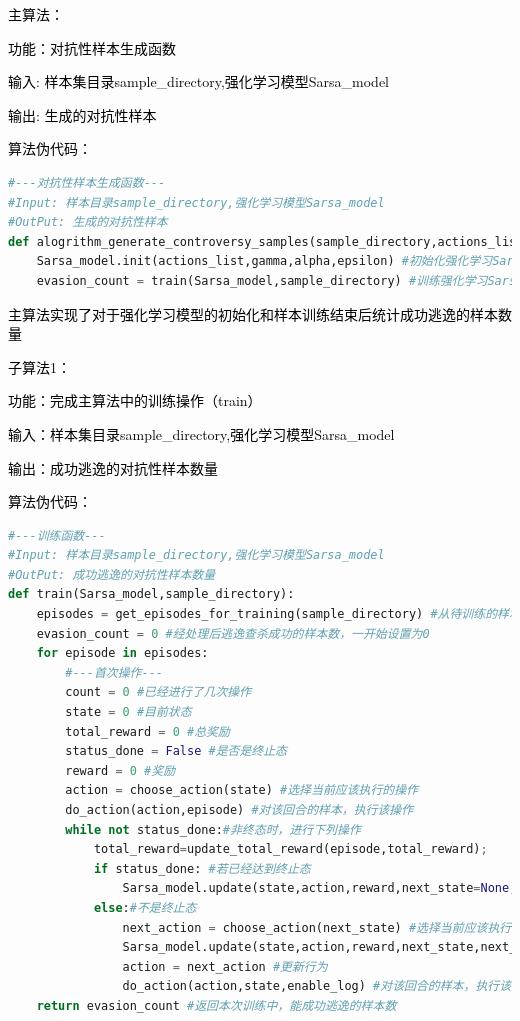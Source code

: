 \textcolor{black}{主算法：}

\textcolor{black}{功能：对抗性样本生成函数}

\textcolor{black}{输入: 样本集目录sample\_directory,强化学习模型Sarsa\_model }

\textcolor{black}{输出: 生成的对抗性样本}

\textcolor{black}{算法伪代码：}

\begin{lstlisting}[language=Python, caption={}, label={lst:pythonfile1}]
#---对抗性样本生成函数---
#Input: 样本目录sample_directory,强化学习模型Sarsa_model 
#OutPut: 生成的对抗性样本
def alogrithm_generate_controversy_samples(sample_directory,actions_list,Sarsa_model):
    Sarsa_model.init(actions_list,gamma,alpha,epsilon) #初始化强化学习Sarsa模型，传入待训练的样本集路径，行为集，学习率，探索率，折扣因子
    evasion_count = train(Sarsa_model,sample_directory) #训练强化学习Sarsa模型
\end{lstlisting}

\textcolor{black}{主算法实现了对于强化学习模型的初始化和样本训练结束后统计成功逃逸的样本数量}

\textcolor{black}{子算法1：}

\textcolor{black}{功能：完成主算法中的训练操作（train）}

\textcolor{black}{输入：样本集目录sample\_directory,强化学习模型Sarsa\_model}

\textcolor{black}{输出：成功逃逸的对抗性样本数量}

\textcolor{black}{算法伪代码：}

\begin{lstlisting}[language=Python, caption={}, label={lst:pythonfile2}]
#---训练函数---
#Input: 样本目录sample_directory,强化学习模型Sarsa_model 
#OutPut: 成功逃逸的对抗性样本数量
def train(Sarsa_model,sample_directory):
    episodes = get_episodes_for_training(sample_directory) #从待训练的样本集路径中获取所有待训练样本
    evasion_count = 0 #经处理后逃逸查杀成功的样本数，一开始设置为0
    for episode in episodes:
        #---首次操作---
        count = 0 #已经进行了几次操作
        state = 0 #目前状态
        total_reward = 0 #总奖励
        status_done = False #是否是终止态
        reward = 0 #奖励
        action = choose_action(state) #选择当前应该执行的操作
        do_action(action,episode) #对该回合的样本，执行该操作
        while not status_done:#非终态时，进行下列操作
            total_reward=update_total_reward(episode,total_reward);
            if status_done: #若已经达到终止态
                Sarsa_model.update(state,action,reward,next_state=None,next_action=None) #更新Sarsa强化学习模型
            else:#不是终止态
                next_action = choose_action(next_state) #选择当前应该执行的操作
                Sarsa_model.update(state,action,reward,next_state,next_action) #更新Sarsa强化学习模型
                action = next_action #更新行为
                do_action(action,state,enable_log) #对该回合的样本，执行该操作
    return evasion_count #返回本次训练中，能成功逃逸的样本数
\end{lstlisting}

